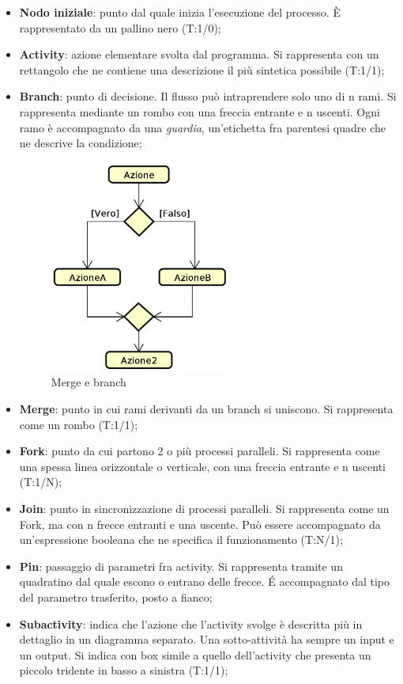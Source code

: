 \begin{itemize}
	\item \textbf{Nodo iniziale}: punto dal quale inizia l'esecuzione del processo. \`E rappresentato da un pallino nero (T:1/0);
	\item \textbf{Activity}: azione elementare svolta dal programma. Si rappresenta con un rettangolo che ne contiene una descrizione il più sintetica possibile (T:1/1);
	\item \textbf{Branch}: punto di decisione. Il flusso può intraprendere solo uno di n rami. Si rappresenta mediante un rombo con una freccia entrante e n uscenti. Ogni ramo è accompagnato da una \textit{guardia}, un'etichetta fra parentesi quadre che ne descrive la condizione;
	\begin{figure}[H]
		\centering
		\includegraphics[width=6cm,keepaspectratio]{img/mergeBranch.png}
		\caption{Merge e branch}
	\end{figure}
	\item \textbf{Merge}: punto in cui rami derivanti da un branch si uniscono. Si rappresenta come un rombo (T:1/1);
	\item \textbf{Fork}: punto da cui partono 2 o più processi paralleli. Si rappresenta come una spessa linea orizzontale o verticale, con una freccia entrante e n uscenti (T:1/N);
	\item \textbf{Join}: punto in sincronizzazione di processi paralleli. Si rappresenta come un Fork, ma con n frecce entranti e una uscente. Può essere accompagnato da un'espressione booleana che ne specifica il funzionamento (T:N/1);
	\item \textbf{Pin}: passaggio di parametri fra activity. Si rappresenta tramite un quadratino dal quale escono o entrano delle frecce. \'E accompagnato dal tipo del parametro trasferito, posto a fianco;
	\item \textbf{Subactivity}: indica che l'azione che l'activity svolge è descritta più in dettaglio in un diagramma separato. Una sotto-attività ha sempre un input e un output. Si indica con box simile a quello dell'activity che presenta un piccolo tridente in basso a sinistra (T:1/1);

\end{itemize}
